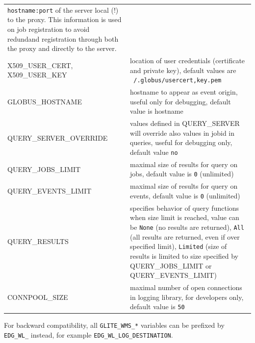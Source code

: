 \begin{tabularx}{\textwidth}{l>{\raggedright\arraybackslash}X}
   \texttt{hostname:port} of the server local (!) to the proxy. This 
   information is used on job registration to avoid redundand 
   registration through both the proxy and directly to the server.\\
X509\_USER\_CERT, X509\_USER\_KEY & 
   location of user credentials (certificate and private key),
   default values are \texttt{~/.globus/user{cert,key}.pem} \\
GLOBUS\_HOSTNAME & 
   hostname to appear as event origin, useful only for debugging, 
   default value is hostname \\
QUERY\_SERVER\_OVERRIDE & 
   values defined in QUERY\_SERVER will override also values in jobid in queries,
   useful for debugging only, 
   default value \texttt{no} \\
QUERY\_JOBS\_LIMIT & 
   maximal size of results for query on jobs, 
   default value is  \texttt{0} (unlimited) \\
QUERY\_EVENTS\_LIMIT & 
   maximal size of results for query on events, 
   default value is  \texttt{0} (unlimited) \\
QUERY\_RESULTS & 
   specifies behavior of query functions when size limit is reached,
   value can be \texttt{None} (no results are returned),
   \texttt{All} (all results are returned, even if over specified limit),
   \texttt{Limited} (size of results is limited to size specified by QUERY\_JOBS\_LIMIT
   or QUERY\_EVENTS\_LIMIT) \\
CONNPOOL\_SIZE & 
   maximal number of open connections in logging library,
   for developers only,
   default value is \texttt{50} \\
\end{tabularx}

For backward compatibility, all \verb'GLITE_WMS_*' variables can be prefixed by
\verb'EDG_WL_' instead, for example \verb'EDG_WL_LOG_DESTINATION'.


